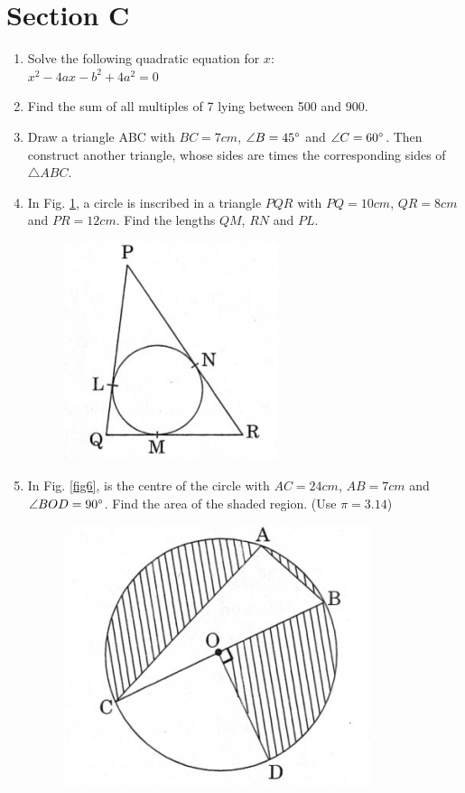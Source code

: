 \documentclass[journal,12pt,twocolumn]{IEEEtran}
\renewcommand\thesection{\arabic{section}}
\begin{document}
\section{Section C}
\renewcommand{\theequation}{\theenumi}
\begin{enumerate}[label=\thesection.\arabic*.,ref=\thesection.\theenumi]
\item Solve the following quadratic equation for $x:$ \\
$x^2-4ax-b^2+4a^2=0$\\
\item Find the sum of all multiples of 7 lying between 500 and 900. \\
\item Draw a triangle ABC with $BC = 7cm$, $\angle B = 45\degree$ and $\angle C = 60\degree$. Then construct another triangle, whose sides are times the corresponding sides of  $\triangle ABC.$ \\
\item In Fig. \ref{fig5}, a circle is inscribed in a triangle $PQR$ with $PQ = 10cm$, $QR = 8cm$ and $PR = 12cm$. Find the lengths $QM$, $RN$ and $PL$.\\
\begin{figure}[h!]
    \centering
    \includegraphics[width=0.5\columnwidth,center]{./fig/5.png}
    \caption{}
    \label{fig5}
 \end{figure}
\label{fig5}
\item In Fig. \ref{fig6}, is the centre of the circle with $AC = 24cm$, $AB=7cm$ and $\angle BOD = 90\degree$. Find the area of the shaded region. (Use $\pi = 3.14$)\\
\begin{figure}[h!]
    \centering
    \includegraphics[width=0.5\columnwidth,center]{./fig/6.png}

\end{figure}
\end{enumerate}
\end{document}
